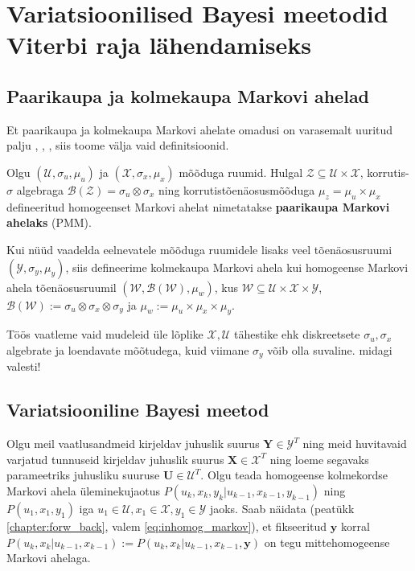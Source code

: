 \section{Variatsioonilised Bayesi meetodid Viterbi raja lähendamiseks}

\subsection{Paarikaupa ja kolmekaupa Markovi ahelad}

Et paarikaupa ja kolmekaupa Markovi ahelate omadusi on varasemalt uuritud palju \parencite{Soop.2023}, \parencite{Avans.2021}, \bla, siis toome välja vaid definitsioonid.

Olgu $(\mathcal{U},\sigma_u,\mu_u)$ ja $(\mathcal{X},\sigma_x,\mu_x)$ mõõduga ruumid. Hulgal $\mathcal{Z} \subseteq \mathcal{U} \times \mathcal{X}$, korrutis-$\sigma$ algebraga $\mathcal{B}(\mathcal{Z}) = \sigma_u \otimes \sigma_x$ ning korrutistõenäosusmõõduga $\mu_z = \mu_u \times \mu_x$ defineeritud homogeenset Markovi ahelat nimetatakse \textbf{paarikaupa Markovi ahelaks} (PMM).

Kui nüüd vaadelda eelnevatele mõõduga ruumidele lisaks veel tõenäosusruumi $(\mathcal{Y},\sigma_y,\mu_y)$, siis defineerime kolmekaupa Markovi ahela kui homogeense Markovi ahela tõenäosusruumil $(\mathcal{W}, \mathcal{B}(\mathcal{W}),\mu_w)$, kus $\mathcal{W} \subseteq \mathcal{U} \times \mathcal{X} \times \mathcal{Y}$, $\mathcal{B}(\mathcal{W}) := \sigma_u \otimes \sigma_x \otimes \sigma_y$ ja $\mu_w := \mu_u \times \mu_x \times \mu_y$.

Töös vaatleme vaid mudeleid üle lõplike $\mathcal{X},\mathcal{U}$ tähestike ehk diskreetsete $\sigma_u, \sigma_x$ algebrate ja loendavate mõõtudega, kuid viimane $\sigma_y$ võib olla suvaline. \bla midagi valesti!


\subsection{Variatsiooniline Bayesi meetod}

Olgu meil vaatlusandmeid kirjeldav juhuslik suurus $\bm{Y} \in \mathcal{Y}^T$ ning meid huvitavaid varjatud tunnuseid kirjeldav juhuslik suurus $\bm{X} \in \mathcal{X}^T$ ning loeme segavaks parameetriks juhusliku suuruse $\bm{U} \in \mathcal{U}^T$. Olgu teada homogeense kolmekordse Markovi ahela üleminekujaotus $P(u_k, x_k, y_k | u_{k-1}, x_{k-1}, y_{k-1})$ ning $P(u_1, x_1, y_1)$ iga $u_1 \in \mathcal{U}, x_1 \in \mathcal{X}, y_1 \in \mathcal{Y}$ jaoks. Saab näidata (peatükk \ref{chapter:forw_back}, valem \ref{eq:inhomog_markov}), et fikseeritud $\bm{y}$ korral $P(u_k, x_k | u_{k-1}, x_{k-1}) := P(u_k, x_k | u_{k-1}, x_{k-1}, \bm{y})$ on tegu mittehomogeense Markovi ahelaga.
    
